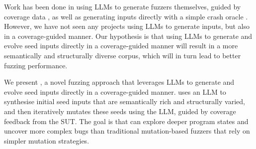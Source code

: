 Work has been done in using LLMs to generate fuzzers themselves, guided by coverage data \cite{chen_2025_elfuzz}, as well as generating inputs directly with a simple crash oracle \cite{xia_2023_universal,lin_2025_lmfuzz}. However, we have not seen any projects using LLMs to generate inputs, but also in a coverage-guided manner. Our hypothesis is that using LLMs to generate and evolve seed inputs directly in a coverage-guided manner will result in a more semantically and structurally diverse corpus, which will in turn lead to better fuzzing performance.

We present \toolname{}, a novel fuzzing approach that leverages LLMs to generate and evolve seed inputs directly in a coverage-guided manner. \toolname{} uses an LLM to synthesise initial seed inputs that are semantically rich and structurally varied, and then iteratively mutates these seeds using the LLM, guided by coverage feedback from the SUT. The goal is that \toolname{} can explore deeper program states and uncover more complex bugs than traditional mutation-based fuzzers that rely on simpler mutation strategies.
